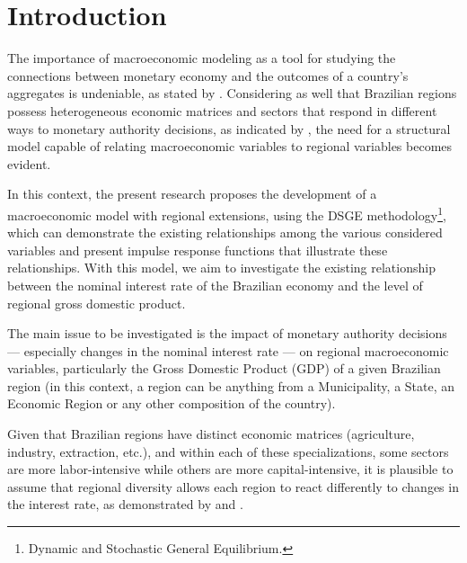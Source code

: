 \documentclass[../thesis.tex]{subfiles}
\begin{document}
\newpage

\section{Introduction}\label{sec:introduction}


The importance of macroeconomic modeling as a tool for studying the connections between monetary economy and the outcomes of a country's aggregates is undeniable, as stated by \textcite{gali_monetary_2015}. Considering as well that Brazilian regions possess heterogeneous economic matrices and sectors that respond in different ways to monetary authority decisions, as indicated by \textcite{bertanha_efeitos_2008}, the need for a structural model capable of relating macroeconomic variables to regional variables becomes evident.

In this context, the present research proposes the development of a macroeconomic model with regional extensions, using the DSGE methodology\footnote{Dynamic and Stochastic General Equilibrium.}, which can demonstrate the existing relationships among the various considered variables and present impulse response functions that illustrate these relationships. With this model, we aim to investigate the existing relationship between the nominal interest rate of the Brazilian economy and the level of regional gross domestic product.


The main issue to be investigated is the impact of monetary authority decisions --- especially changes in the nominal interest rate --- on regional macroeconomic variables, particularly the Gross Domestic Product (GDP) of a given Brazilian region (in this context, a region can be anything from a Municipality, a State, an Economic Region or any other composition of the country).

Given that Brazilian regions have distinct economic matrices (agriculture, industry, extraction, etc.), and within each of these specializations, some sectors are more labor-intensive while others are more capital-intensive, it is plausible to assume that regional diversity allows each region to react differently to changes in the interest rate, as demonstrated by \textcite{haddad_matriz_2017} and \textcite{osterno_uma_2022}.
\end{document}
